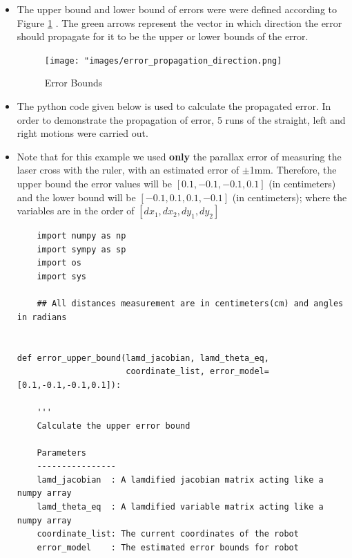 {\begin{itemize}
           
            
               
          \item The upper bound and lower bound of errors were were defined according to Figure \ref{fig:Error Bounds} . The green arrows represent the vector in which direction the error should propagate for it to be the upper or lower bounds of the error.    
          
          \begin{figure}[ht!] 
                        \centering
                        \texttt{[image: "images/error\_propagation\_direction.png]}
                        \caption{Error Bounds}
                        \label{fig:Error Bounds}
         \end{figure}
                
                
            
        \item The python code given below is used to calculate the propagated error. In order to demonstrate the propagation of error, 5 runs of the straight, left and right motions were carried out. 
        
        \item Note that for this example we used \textbf{only} the parallax error of measuring the laser cross with the ruler, with an estimated error of $\pm$1mm. Therefore, the upper bound the error values will be $[0.1, -0.1, -0.1, 0.1]$ (in centimeters) and the lower bound will be $[-0.1, 0.1, 0.1, -0.1]$ (in centimeters); where the variables are in the order of $[dx_1, dx_2, dy_1, dy_2]$
            
            
        \begin{verbatim}
    import numpy as np
    import sympy as sp
    import os
    import sys
    
    ## All distances measurement are in centimeters(cm) and angles in radians 


def error_upper_bound(lamd_jacobian, lamd_theta_eq, 
                      coordinate_list, error_model=[0.1,-0.1,-0.1,0.1]):
    
    '''
    Calculate the upper error bound
    
    Parameters
    ----------------
    lamd_jacobian  : A lamdified jacobian matrix acting like a numpy array
    lamd_theta_eq  : A lamdified variable matrix acting like a numpy array
    coordinate_list: The current coordinates of the robot
    error_model    : The estimated error bounds for robot
    

\end{verbatim}
\end{itemize}}
